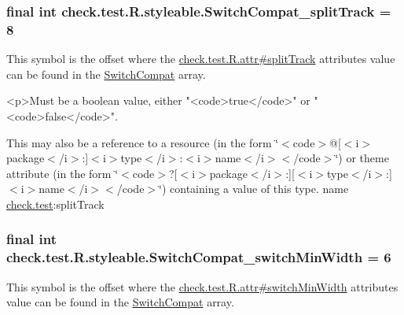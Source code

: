 \subsubsection[{Switch\+Compat\+\_\+split\+Track}]{\setlength{\rightskip}{0pt plus 5cm}final int check.\+test.\+R.\+styleable.\+Switch\+Compat\+\_\+split\+Track = 8\hspace{0.3cm}{\ttfamily [static]}}\label{classcheck_1_1test_1_1_r_1_1styleable_a2209e4bf912668ea5826e5f0fbb4196e}
This symbol is the offset where the \hyperlink{classcheck_1_1test_1_1_r_1_1attr_ab99b6ed868beb51a77072e77f5938343}{check.\+test.\+R.\+attr\#split\+Track} attribute\textquotesingle{}s value can be found in the \hyperlink{classcheck_1_1test_1_1_r_1_1styleable_a0c8f3659ebec12826f8a2493fe43eaf4}{Switch\+Compat} array.

\begin{DoxyVerb}      <p>Must be a boolean value, either "<code>true</code>" or "<code>false</code>".
\end{DoxyVerb}
 

This may also be a reference to a resource (in the form \char`\"{}$<$code$>$@\mbox{[}$<$i$>$package$<$/i$>$\+:\mbox{]}$<$i$>$type$<$/i$>$\+:$<$i$>$name$<$/i$>$$<$/code$>$\char`\"{}) or theme attribute (in the form \char`\"{}$<$code$>$?\mbox{[}$<$i$>$package$<$/i$>$\+:\mbox{]}\mbox{[}$<$i$>$type$<$/i$>$\+:\mbox{]}$<$i$>$name$<$/i$>$$<$/code$>$\char`\"{}) containing a value of this type.  name \hyperlink{namespacecheck_1_1test}{check.\+test}\+:split\+Track \hypertarget{classcheck_1_1test_1_1_r_1_1styleable_a5008f56d15445e1e76705edbb100cbd3}{}
\subsubsection[{Switch\+Compat\+\_\+switch\+Min\+Width}]{\setlength{\rightskip}{0pt plus 5cm}final int check.\+test.\+R.\+styleable.\+Switch\+Compat\+\_\+switch\+Min\+Width = 6\hspace{0.3cm}{\ttfamily [static]}}\label{classcheck_1_1test_1_1_r_1_1styleable_a5008f56d15445e1e76705edbb100cbd3}
This symbol is the offset where the \hyperlink{classcheck_1_1test_1_1_r_1_1attr_aab06ab49d50f5d3f49bf75148054587f}{check.\+test.\+R.\+attr\#switch\+Min\+Width} attribute\textquotesingle{}s value can be found in the \hyperlink{classcheck_1_1test_1_1_r_1_1styleable_a0c8f3659ebec12826f8a2493fe43eaf4}{Switch\+Compat} array.

